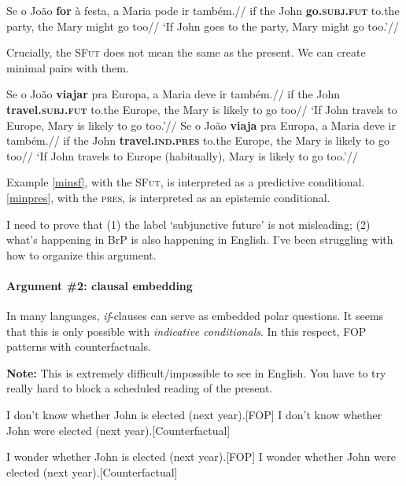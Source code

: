 \documentclass{linghandout}
\newcommand{\sfut}{\textsc{SFut}\xspace}
\begin{document}
\ex\label{brp1}
\begingl 
\gla Se o João \textbf{for} \`{a} festa, a Maria pode ir também.//
\glb if the John \textbf{go.\textsc{subj.fut}} to.the party, the Mary might go too//
\glft `If John goes to the party, Mary might go too.'//
\endgl
\xe 

Crucially, the \sfut does not mean the same as the present. We can create minimal pairs with them.

\pex
\a\label{minsf}
\begingl 
\gla Se o João \textbf{viajar} pra Europa, a Maria deve ir também.//
\glb if the John \textbf{travel.\textsc{subj.fut}} to.the Europe, the Mary {is likely to} go too//
\glft `If John travels to Europe, Mary is likely to go too.'//
\endgl
\a\label{minpres}
\begingl 
\gla Se o João \textbf{viaja} pra Europa, a Maria deve ir também.//
\glb if the John \textbf{travel.\textsc{ind.pres}} to.the Europe, the Mary {is likely to} go too//
\glft `If John travels to Europe (habitually), Mary is likely to go too.'//
\endgl
\xe 

Example \eqref{minsf}, with the \sfut, is interpreted as a predictive conditional. \eqref{minpres}, with the \textsc{pres}, is interpreted as an epistemic conditional.

\begin{fancybox}{}
I need to prove that (1) the label `subjunctive future' is not misleading; (2) what's happening in BrP is also happening in English. I've been struggling with how to organize this argument.
\end{fancybox}

\paragraph{Argument \#2: clausal embedding} In many languages, \textit{if}-clauses can serve as embedded polar questions. It seems that this is only possible with \textit{indicative conditionals}. In this respect, FOP patterns with counterfactuals. 

\textbf{Note:} This is extremely difficult/impossible to see in English. You have to try really hard to block a scheduled reading of the present.

\pex 
\a{}I don't know whether John is elected (next year).\hfill [FOP]
\a{}I don't know whether John were elected (next year).\hfill [Counterfactual]
\xe

\pex 
\a{}I wonder whether John is elected (next year).\hfill [FOP]
\a{}I wonder whether John were elected (next year).\hfill [Counterfactual]
\xe
\end{document}
